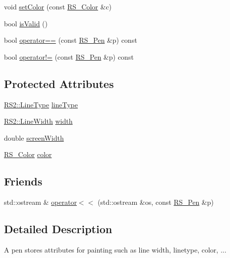 \begin{DoxyCompactItemize}
\item 
void \hyperlink{class_r_s___pen_ae54fc1847b7b2f5de84d32152a677679}{set\-Color} (const \hyperlink{class_r_s___color}{R\-S\-\_\-\-Color} \&c)
\item 
bool \hyperlink{class_r_s___pen_af4034d62099798469b196b409b9d37d3}{is\-Valid} ()
\item 
bool \hyperlink{class_r_s___pen_abe2b1b61d157ca3da68f5cbea94988ea}{operator==} (const \hyperlink{class_r_s___pen}{R\-S\-\_\-\-Pen} \&p) const 
\item 
bool \hyperlink{class_r_s___pen_aebbe1d462b618a163efe4d16c7998261}{operator!=} (const \hyperlink{class_r_s___pen}{R\-S\-\_\-\-Pen} \&p) const 
\end{DoxyCompactItemize}
\subsection*{Protected Attributes}
\begin{DoxyCompactItemize}
\item 
\hyperlink{class_r_s2_a6f3a82972c2d62456f6cacb74e14c95f}{R\-S2\-::\-Line\-Type} \hyperlink{class_r_s___pen_a69545beb2a93c9d20cb679d909d3224b}{line\-Type}
\item 
\hyperlink{class_r_s2_a023485c482c5ee9e36b3dfad781adf29}{R\-S2\-::\-Line\-Width} \hyperlink{class_r_s___pen_a2433e433183b582fe538e6fd2b4588cf}{width}
\item 
double \hyperlink{class_r_s___pen_a137d5080a8cd36268b4fea3fa12c1418}{screen\-Width}
\item 
\hyperlink{class_r_s___color}{R\-S\-\_\-\-Color} \hyperlink{class_r_s___pen_a4b44b65046fe820fdc3661c2f47660ae}{color}
\end{DoxyCompactItemize}
\subsection*{Friends}
\begin{DoxyCompactItemize}
\item 
std\-::ostream \& \hyperlink{class_r_s___pen_a7ea20de3fa31120ba9fd33c26910e187}{operator$<$$<$} (std\-::ostream \&os, const \hyperlink{class_r_s___pen}{R\-S\-\_\-\-Pen} \&p)
\end{DoxyCompactItemize}


\subsection{Detailed Description}
A pen stores attributes for painting such as line width, linetype, color, ... 

